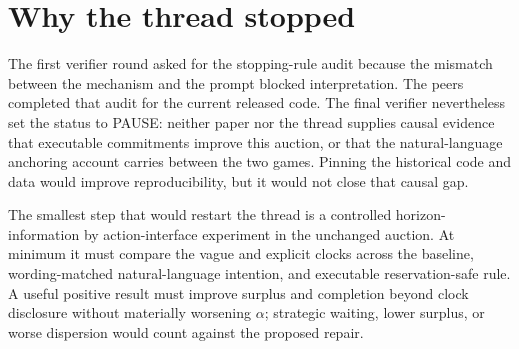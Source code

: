 \documentclass{article}
\begin{document}
\section{Why the thread stopped}

The first verifier round asked for the stopping-rule audit because the mismatch between the mechanism and the prompt blocked interpretation.  The peers completed that audit for the current released code.  The final verifier nevertheless set the status to PAUSE: neither paper nor the thread supplies causal evidence that executable commitments improve this auction, or that the natural-language anchoring account carries between the two games.  Pinning the historical code and data would improve reproducibility, but it would not close that causal gap.

The smallest step that would restart the thread is a controlled horizon-information by action-interface experiment in the unchanged auction.  At minimum it must compare the vague and explicit clocks across the baseline, wording-matched natural-language intention, and executable reservation-safe rule.  A useful positive result must improve surplus and completion beyond clock disclosure without materially worsening $\alpha$; strategic waiting, lower surplus, or worse dispersion would count against the proposed repair.

\enlargethispage{3\baselineskip}


\end{document}
